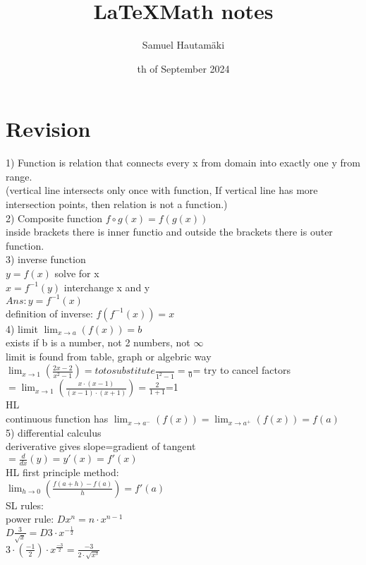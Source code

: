 \documentclass{article}
\title{\LaTeX Math notes}
\author{Samuel Hautamäki}
\date{th of September 2024}
\begin{document}
  \maketitle
   
  \section{Revision}
  1) Function is relation that connects every x from domain into exactly one y from range.\\
  (vertical line intersects only once with function, If vertical line has more intersection points, then relation is not a function.)\\
  2) Composite function $f\circ g(x)=f(g(x))$\\
  inside brackets there is inner functio and outside the brackets there is outer function.\\
  3) inverse function\\
  $y=f(x)$ solve for x\\
  $x=f^{-1}(y)$ interchange x and y\\
  $Ans: y=f^{-1}(x)$\\
  definition of inverse: $f(f^{-1}(x))=x$\\
  4) limit $\lim_{x\to a}(f(x))=b$\\
  exists if b is a number, not 2 numbers, not $\infty$\\
  limit is found from table, graph or algebric way\\
  $\lim_{x\to1}(\frac{2x-2}{x^2-1})=to to substitute\frac{}{1^2-1}=\frac{}{0}$= try to cancel factors\\
  $=\lim_{x\to1}(\frac{x\cdot(x-1)}{(x-1)\cdot(x+1)})=\frac{2}{1+1}$=1\\
  HL\\
  continuous function has $\lim_{x\to a^-}(f(x))=\lim_{x\to a^+}(f(x))=f(a)$\\
  5) differential calculus\\
  deriverative gives slope=gradient of tangent\\
  $=\frac{d}{dx}(y)=y'(x)=f'(x)$\\
  HL first principle method:\\
  $\lim_{h\to0}(\frac{f(a+h)-f(a)}{h})=f'(a)$\\
  SL rules:\\
  power rule: $D x^n=n\cdot x^{n-1}$\\
  $D \frac{3}{\sqrt{x}}=D 3\cdot x^{-\frac{1}{2}}$\\
  $3\cdot(\frac{-1}{2})\cdot x^{\frac{-3}{2}}=\frac{-3}{2\cdot\sqrt{x^3}}$\\
\end{document}
